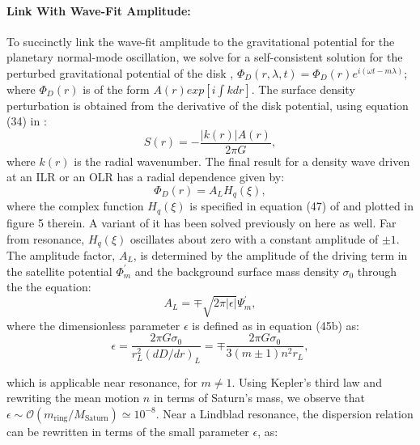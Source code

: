 \documentclass{article}
\begin{document}
\vspace{3}

\paragraph{Link With Wave-Fit Amplitude:}

\vspace{3}

To succinctly link the wave-fit amplitude to the gravitational potential for the planetary normal-mode oscillation, we solve for a self-consistent solution for the perturbed gravitational potential of the disk \cite{1984prin.conf..513S}, $\Phi_{D}(r,\lambda,t) = \Phi_{D}(r)e^{i(\omega t - m \lambda)}$; where $\Phi_{D}(r)$ is of the form $A(r)exp[i\int k dr]$. The surface density perturbation is obtained from the derivative of the disk potential, using equation (34) in \cite{1984prin.conf..513S}:
\begin{equation}
    S(r) = - \frac{|k(r)|A(r)}{2\pi G},
\end{equation}
where $k(r)$ is the radial wavenumber. The final result for a density wave driven at an ILR or an OLR has a radial dependence given by:
\begin{equation}
    \Phi_{D}(r) = A_{L}H_{q}(\xi),
\end{equation}
where the complex function $H_{q}(\xi)$ is specified in equation (47) of \cite{1984prin.conf..513S} and plotted in figure 5 therein. A variant of it has been solved previously on here as well. Far from resonance, $H_{q}(\xi)$ oscillates about zero with a constant amplitude of $\pm1$. The amplitude factor, $A_{L}$, is determined by the amplitude of the driving term in the satellite potential $\Phi_{m}^{'}$ and the background surface mass density $\sigma_{0}$ through the the equation:
\begin{equation}
    A_{L} = \mp\sqrt{2\pi|\epsilon|}\Psi_{m}^{'},
\end{equation}
where the dimensionless parameter $\epsilon$ is defined as in \cite{1984prin.conf..513S} equation (45b) as:
\begin{equation}
    \epsilon = \frac{2\pi G \sigma_{0}}{r_{L}^{2}(dD/dr)_{L}} = \mp \frac{2\pi G \sigma_{0}}{3(m\pm1)n^{2}r_{L}},
\end{equation}

which is applicable near resonance, for $m \neq 1$. Using Kepler's third law and rewriting the mean motion $n$ in terms of Saturn's mass, we observe that $\epsilon \sim \mathcal{O} \left({m_{\text{ring}}}/{M_{\text{Saturn}}}\right) \simeq 10^{-8}$. Near a Lindblad resonance, the dispersion relation can be rewritten in terms of the small parameter $\epsilon$, as:
\end{document}
